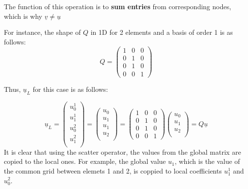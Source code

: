 \documentclass[
  a4paper,
  10pt]{article}
\begin{document}
The function of this operation is to \textbf{sum entries} from
corresponding nodes, which is why \(\underline{v} \neq \underline{u}\)

For instance, the shape of \(Q\) in 1D for 2 elements and a basis of
order 1 is as follows: \begin{equation}
    Q=
    \begin{pmatrix}
           1    &   0     &0 \\
           0    &    1    & 0\\
            0  &   1     & 0\\
            0   &    0    & 1
    \end{pmatrix} 
\end{equation}

Thus, \(\underline{u}_L\) for this case is as follows:

\begin{equation}
    \underline{u}_L=
    \begin{pmatrix}
    {u}^{1}_{0} \\
    {u}^{1}_{1} \\
    {u}^{2}_{0} \\
    {u}^{2}_{1} \\
    \end{pmatrix}=
    \begin{pmatrix}
    {u}_{0} \\
    {u}_{1} \\
    {u}_{1} \\
    {u}_{2} \\
    \end{pmatrix}=
     \begin{pmatrix}
           1    &   0     &0 \\
           0    &    1    & 0\\
            0  &   1     & 0\\
            0   &    0    & 1
    \end{pmatrix} 
    \begin{pmatrix}
    {u}_{0} \\
    {u}_{1} \\
    {u}_{2} \\
    \end{pmatrix}=
    Q\underline{u}
\end{equation} It is clear that using the scatter operator, the values
from the global matrix are copied to the local ones. For example, the
global value \({u}_{1}\), which is the value of the common grid between
elemets 1 and 2, is coppied to local coefficients \({u}^{1}_{1}\) and
\({u}^{2}_{0}\).
\end{document}
